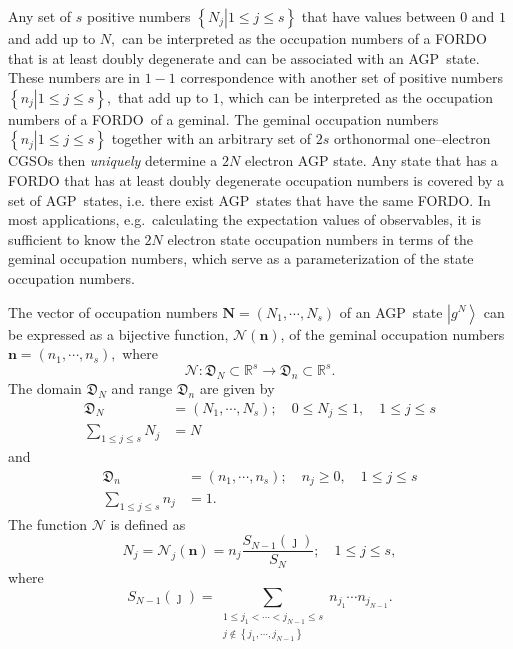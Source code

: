 \documentclass[aps,preprint]{revtex4}%
\begin{document}
Any set of $s$ positive numbers $\left\{  \left.  N_{j}\right\vert 1\leq j\leq
s\right\}  $ that have values between $0$ and $1$ and add up to $N,$ can be
interpreted as the occupation numbers of a FORDO that is at least doubly
degenerate and can be associated with an AGP\ state. These numbers are in
$1-1$ correspondence with another set of positive numbers $\left\{  \left.
n_{j}\right\vert 1\leq j\leq s\right\}  ,$ that add up to $1$, which can be
interpreted as the occupation numbers of a FORDO\ of a geminal. The geminal
occupation numbers $\left\{  \left.  n_{j}\right\vert 1\leq j\leq s\right\}  $
together with an arbitrary set of $2s$ orthonormal one--electron CGSOs then
\emph{uniquely }determine a $2N$ electron AGP state. Any state that has a
FORDO that has at least doubly degenerate occupation numbers is covered by a
set of AGP\ states, i.e. there exist AGP\ states that have the same FORDO. In
most applications, e.g.\ calculating the expectation values of observables, it
is sufficient to know the $2N$ electron state occupation numbers in terms of
the geminal occupation numbers, which serve as a parameterization of the state
occupation numbers.

The vector of occupation numbers $\mathbf{N}=\left(  N_{1},\cdots
,N_{s}\right)  $ of an AGP\ state $\left\vert g^{N}\right\rangle $ can be
expressed as a bijective function, $\mathcal{N}\left(  \mathbf{n}\right)  $,
of the geminal occupation numbers $\mathbf{n}=\left(  n_{1},\cdots
,n_{s}\right)  ,$ where
\begin{equation}
\mathcal{N}:\mathfrak{D}_{N}\subset\mathbb{R}^{s}\rightarrow\mathfrak{D}%
_{n}\subset\mathbb{R}^{s}.
\end{equation}
The domain $\mathfrak{D}_{N}$ and range $\mathfrak{D}_{n}$ are given by%
\begin{align}
\mathfrak{D}_{N}  &  =\left(  N_{1},\cdots,N_{s}\right)  ;\quad0\leq N_{j}%
\leq1,\quad1\leq j\leq s\nonumber\\
\sum_{1\leq j\leq s}N_{j}  &  =N
\end{align}
and
\begin{align}
\mathfrak{D}_{n}  &  =\left(  n_{1},\cdots,n_{s}\right)  ;\quad n_{j}%
\geq0,\quad1\leq j\leq s\nonumber\\
\sum_{1\leq j\leq s}n_{j}  &  =1.
\end{align}
The function $\mathcal{N}$ is defined as
\begin{equation}
N_{j}=\mathcal{N}_{j}\left(  \mathbf{n}\right)  =n_{j}\frac{S_{N-1}\left(
\jmath\right)  }{S_{N}};\quad1\leq j\leq s,
\end{equation}
where
\begin{equation}
S_{N-1}\left(  \jmath\right)  =\sum_{\substack{1\leq j_{1}<\cdots<j_{N-1}\leq
s\\j\notin\left\{  j_{1},\cdots,j_{N-1}\right\}  }}n_{j_{1}}\cdots n_{j_{N-1}%
}.
\end{equation}
\end{document}
